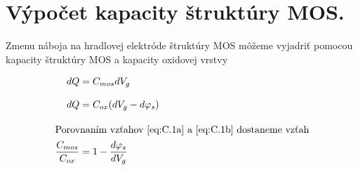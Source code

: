 
\chapter{Výpočet kapacity štruktúry MOS.}\label{app:AppendixC}

Zmenu náboja na hradlovej elektróde štruktúry MOS môžeme vyjadriť
pomocou kapacity štruktúry MOS a kapacity oxidovej vrstvy

\begin{subequations}\label{eq:C.1}
  \begin{align}
    dQ &= C_{mos} dV_g                                    \label{eq:C.1a}\\[0.3cm]
    dQ &= C_{ox} (dV_g - d\varphi_s)                      \label{eq:C.1b}\\[0.3cm]
    \intertext{Porovnaním vzťahov~\ref{eq:C.1a} a~\ref{eq:C.1b} dostaneme vzťah}
    \frac{C_{mos}}{C_{ox}} &= 1 - \frac{d\varphi_s}{dV_g} \label{eq:C.1c}
\end{align}
\end{subequations}
